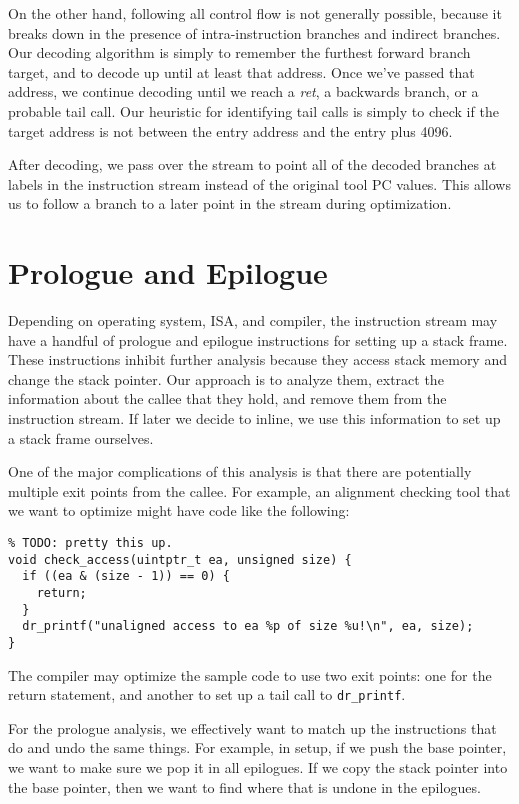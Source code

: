 On the other hand, following all control flow is not generally possible, because
it breaks down in the presence of intra-instruction branches and indirect
branches.  Our decoding algorithm is simply to remember the furthest forward
branch target, and to decode up until at least that address.  Once we've passed
that address, we continue decoding until we reach a {\em ret}, a backwards
branch, or a probable tail call.  Our heuristic for identifying tail calls is
simply to check if the target address is not between the entry address and the
entry plus 4096.

After decoding, we pass over the stream to point all of the decoded branches at
labels in the instruction stream instead of the original tool PC values.  This
allows us to follow a branch to a later point in the stream during optimization.

\section{Prologue and Epilogue}

Depending on operating system, ISA, and compiler, the instruction stream may
have a handful of prologue and epilogue instructions for setting up a stack
frame.  These instructions inhibit further analysis because they access stack
memory and change the stack pointer.  Our approach is to analyze them, extract
the information about the callee that they hold, and remove them from the
instruction stream.  If later we decide to inline, we use this information to
set up a stack frame ourselves.

One of the major complications of this analysis is that there are potentially
multiple exit points from the callee.  For example, an alignment checking tool
that we want to optimize might have code like the following:

\begin{verbatim}
% TODO: pretty this up.
void check_access(uintptr_t ea, unsigned size) {
  if ((ea & (size - 1)) == 0) {
    return;
  }
  dr_printf("unaligned access to ea %p of size %u!\n", ea, size);
}
\end{verbatim}

The compiler may optimize the sample code to use two exit points: one for the
return statement, and another to set up a tail call to {\tt dr\_printf}.

For the prologue analysis, we effectively want to match up the instructions that
do and undo the same things.  For example, in setup, if we push the base
pointer, we want to make sure we pop it in all epilogues.  If we copy the stack
pointer into the base pointer, then we want to find where that is undone in the
epilogues.

